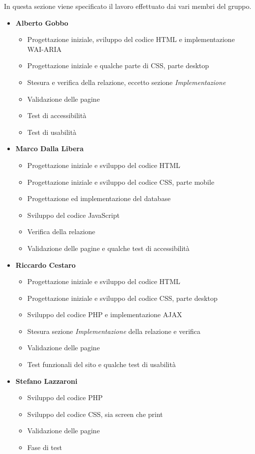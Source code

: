 In questa sezione viene specificato il lavoro effettuato dai vari membri del gruppo.
\begin{itemize}
	\item \textbf{Alberto Gobbo}
	\begin{itemize}
		\item Progettazione iniziale, sviluppo del codice HTML e implementazione WAI-ARIA
		\item Progettazione iniziale e qualche parte di CSS, parte desktop 
		\item Stesura e verifica della relazione, eccetto sezione \emph{Implementazione}
		\item Validazione delle pagine
		\item Test di accessibilità
		\item Test di usabilità
	\end{itemize}	
	\item \textbf{Marco Dalla Libera}
	\begin{itemize}
		\item Progettazione iniziale e sviluppo del codice HTML
		\item Progettazione iniziale e sviluppo del codice CSS, parte mobile
		\item Progettazione ed implementazione del database
		\item Sviluppo del codice JavaScript
		\item Verifica della relazione
		\item Validazione delle pagine e qualche test di accessibilità
	\end{itemize}	
	\item \textbf{Riccardo Cestaro}
	\begin{itemize}
		\item Progettazione iniziale e sviluppo del codice HTML
		\item Progettazione iniziale e sviluppo del codice CSS, parte desktop
		\item Sviluppo del codice PHP e implementazione AJAX
		\item Stesura sezione \emph{Implementazione} della relazione e verifica
		\item Validazione delle pagine
		\item Test funzionali del sito e qualche test di usabilità
	\end{itemize}	
	\item \textbf{Stefano Lazzaroni}
	\begin{itemize}
		\item Sviluppo del codice PHP
		\item Sviluppo del codice CSS, sia screen che print
		\item Validazione delle pagine
		\item Fase di test
	\end{itemize}	
\end{itemize}

